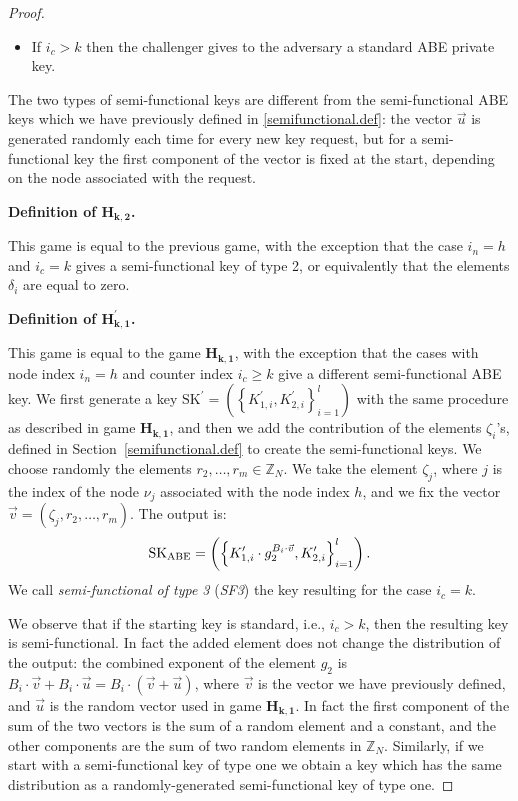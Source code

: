 \documentclass[a4paper,10pt]{article}
\newcommand{\Z}{\mathbb{Z}}
\newcommand{\varRow}{l}
\newcommand{\varColumn}{m}
\newcommand{\randomchoose}[1]{We choose randomly the element\ifstrequal{#1}{s}{}{s} }
\newcommand{\game}[2]{$\mathbf{#1_{#2}}$}
\newcommand{\gamedef}[3]{
\textbf{Definition of \game{#1}{#2}.}
#3}
\newcommand{\sfthree}{SF3}
\begin{document}
\begin{proof}
{\begin{itemize}
			\item
			If $i_c>k$ then the challenger gives to the adversary a standard ABE private key.
		\end{itemize}
		The two types of semi-functional keys are different from the semi-functional ABE keys which we have previously defined in \ref{semifunctional.def}: the vector $\vec{u}$ is generated randomly each time for every new key request, but for a semi-functional key the first component of the vector is fixed at the start, depending on the node associated with the request.
		}
		
		\gamedef{H}{k,2}{
		This game is equal to the previous game, with the exception that the case $i_n=h$ and $i_c=k$ gives a semi-functional key of type 2, or equivalently that the elements $\delta_i$ are equal to zero.
		}
		
		\gamedef{H^\prime}{k,1}{
		This game is equal to the game \game{H}{k,1}, with the exception that the cases with node index $i_n=h$ and counter index $i_c\geq k$ give a different semi-functional ABE key. We first generate a key $\mathrm{SK}^\prime=(\left\{K^{\prime}_{1,i},\allowbreak K^{\prime}_{2,i}\right\}_{i=1}^\varRow )$ with the same procedure as described in game \game{H}{k,1}, and then we add the contribution of the elements $\zeta_i$'s, defined in Section~\ref{semifunctional.def} to create the semi-functional keys.
		\randomchoose{p}{$r_2,\ldots,r_\varColumn\in\Z_N$.
		}
		We take the element $\zeta_j$, where $j$ is the index of the node $\nu_j$ associated with the node index $h$, and we fix the vector $\vec{v}=(\zeta_j,r_2,\ldots,r_\varColumn)$. The output is:
		\[
			\mathrm{SK}_{\textnormal{ABE}}=
			\left(\left\{
			K^{\prime}_{1,i}\cdot g_2^{B_i\cdot \vec{v}},
			K^{\prime}_{2,i}\right
			\}_{i=1}^{\varRow}\right).
		\]
		We call \emph{semi-functional of type 3} (\emph{\sfthree}) the key resulting for the case ${i_c=k}$.
		
		We observe that if the starting key is standard, i.e., $i_c>k$, then the resulting key is semi-functional. In fact the added element does not change the distribution of the output: the combined exponent of the element $g_2$ is $B_i\cdot \vec{v} + B_i \cdot \vec{u}=B_i\cdot (\vec{v}+\vec{u})$, where $\vec{v}$ is the vector we have previously defined, and $\vec{u}$ is the random vector used in game \game{H}{k,1}. In fact the first component of the sum of the two vectors is the sum of a random element and a constant, and the other components are the sum of two random elements in $\Z_N$.
		Similarly, if we start with a semi-functional key of type one we obtain a key which has the same distribution as a randomly-generated semi-functional key of type one.
		}
		

\end{proof}
\end{document}
